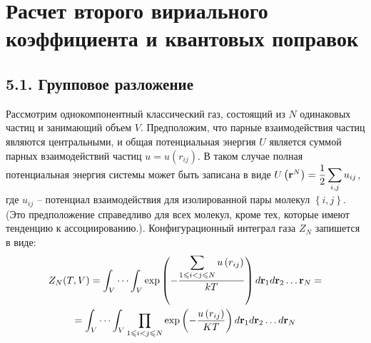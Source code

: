 \section{Расчет второго вириального коэффициента и квантовых поправок}

\subsection*{\textbf{5.1.} Групповое разложение \cite{eremin, hirsch}}


Рассмотрим однокомпонентный классический газ, состоящий из $N$ одинаковых частиц и занимающий объем $V$. Предположим, что парные взаимодействия частиц являются центральными, и общая потенциальная энергия $U$ является суммой парных взаимодействий частиц $u = u(r_{ij})$. В таком случае полная потенциальная энергия системы может быть записана в виде $U \left( \mathbf{r}^N \right) = \displaystyle \dfrac{1}{2} \sum_{i, j} u_{ij}$, где $u_{ij}$ -- потенциал взаимодействия для изолированной пары молекул $\left\{ i, j \right\}$. (Это предположение справедливо для всех молекул, кроме тех, которые имеют тенденцию к ассоциированию.). Конфигурационный интеграл газа $Z_N$ запишется в виде:
\vverh
\begin{gather}
	Z_N (T, V) = \int_V \cdots \int_V \exp \left( - \frac{\displaystyle\sum_{1 \leqslant i < j \leqslant N} u \left( r_{ij} \right)}{kT} \right) d \mathbf{r}_1 d \mathbf{r}_2 \dots \mathbf{r}_N = \notag \\
	= \int_V \cdots \int_V \prod_{1 \leqslant i < j \leqslant N} \exp \left( - \frac{u \left( r_{ij} \right)}{KT} \right) d \mathbf{r}_1 d \mathbf{r}_2 \dots d \mathbf{r}_N \label{confint}
\end{gather}

